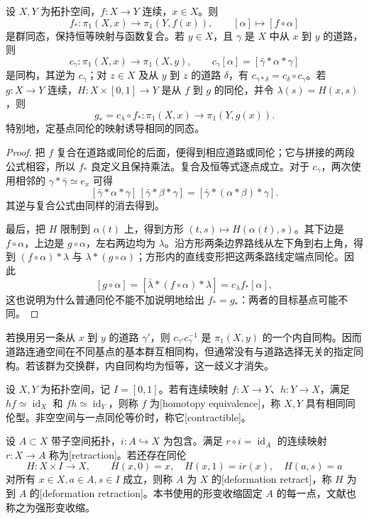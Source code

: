 \begin{proposition}\label{g2:prop:basepoint-change}
	设 \(X,Y\) 为拓扑空间，\(f:X\rightarrow Y\) 连续，\(x\in X\)。则
	\[
		f_*:\pi_1(X,x)\longrightarrow\pi_1(Y,f(x)),\qquad [\alpha]\longmapsto[f\circ\alpha]
	\]
	是群同态，保持恒等映射与函数复合。若 \(y\in X\)，且 \(\gamma\) 是 \(X\) 中从 \(x\) 到 \(y\) 的道路，则
	\[
		c_\gamma:\pi_1(X,x)\longrightarrow\pi_1(X,y),\qquad
		c_\gamma[\alpha]=[\bar\gamma*\alpha*\gamma]
	\]
	是同构，其逆为 \(c_{\bar\gamma}\)；对 \(z\in X\) 及从 \(y\) 到 \(z\) 的道路 \(\delta\)，有 \(c_{\gamma*\delta}=c_\delta\circ c_\gamma\)。若 \(g:X\rightarrow Y\) 连续，\(H:X\times[0,1]\rightarrow Y\) 是从 \(f\) 到 \(g\) 的同伦，并令 \(\lambda(s)=H(x,s)\)，则
	\[
		g_*=c_\lambda\circ f_*:\pi_1(X,x)\longrightarrow\pi_1(Y,g(x)).
	\]
	特别地，定基点同伦的映射诱导相同的同态。
\end{proposition}
\begin{proof}
	把 \(f\) 复合在道路或同伦的后面，便得到相应道路或同伦；它与拼接的两段公式相容，所以 \(f_*\) 良定义且保持乘法。复合及恒等式逐点成立。对于 \(c_\gamma\)，两次使用相邻的 \(\gamma*\bar\gamma\simeq e_x\) 可得
	\[
		[\bar\gamma*\alpha*\gamma]\,[\bar\gamma*\beta*\gamma]
		=[\bar\gamma*(\alpha*\beta)*\gamma].
	\]
	其逆与复合公式由同样的消去得到。

	最后，把 \(H\) 限制到 \(\alpha(t)\) 上，得到方形 \((t,s)\mapsto H(\alpha(t),s)\)。其下边是 \(f\circ\alpha\)，上边是 \(g\circ\alpha\)，左右两边均为 \(\lambda\)。沿方形两条边界路线从左下角到右上角，得到 \((f\circ\alpha)*\lambda\) 与 \(\lambda*(g\circ\alpha)\)；方形内的直线变形把这两条路线定端点同伦。因此
	\[
		[g\circ\alpha]=[\bar\lambda*(f\circ\alpha)*\lambda]=c_\lambda f_*[\alpha],
	\]
	这也说明为什么普通同伦不能不加说明地给出 \(f_*=g_*\)：两者的目标基点可能不同。
\end{proof}

若换用另一条从 \(x\) 到 \(y\) 的道路 \(\gamma'\)，则 \(c_{\gamma'}c_\gamma^{-1}\) 是 \(\pi_1(X,y)\) 的一个内自同构。因而道路连通空间在不同基点的基本群互相同构，但通常没有与道路选择无关的指定同构。若该群为交换群，内自同构均为恒等，这一歧义才消失。

\begin{definition}[同伦等价与形变收缩]\label{g2:def:homotopy-equivalence-retract}
	设 \(X,Y\) 为拓扑空间，记 \(I=[0,1]\)。若有连续映射 \(f:X\rightarrow Y\)、\(h:Y\rightarrow X\)，满足 \(hf\simeq\operatorname{id}_X\) 和 \(fh\simeq\operatorname{id}_Y\)，则称 \(f\) 为[homotopy equivalence]，称 \(X,Y\) 具有相同同伦型。非空空间与一点同伦等价时，称它[contractible]。

	设 \(A\subset X\) 带子空间拓扑，\(i:A\hookrightarrow X\) 为包含。满足 \(r\circ i=\operatorname{id}_A\) 的连续映射 \(r:X\rightarrow A\) 称为[retraction]。若还存在同伦
	\[
		H:X\times I\longrightarrow X,\qquad H(x,0)=x,\quad H(x,1)=ir(x),\quad H(a,s)=a
	\]
	对所有 \(x\in X,a\in A,s\in I\) 成立，则称 \(A\) 为 \(X\) 的[deformation retract]，称 \(H\) 为到 \(A\) 的[deformation retraction]。本书使用的形变收缩固定 \(A\) 的每一点，文献也称之为强形变收缩。
\end{definition}

